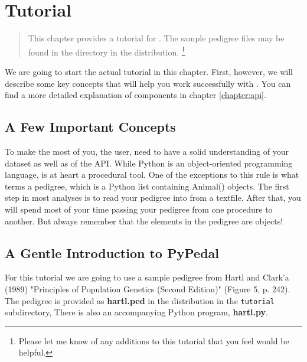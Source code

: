 \chapter{Tutorial}
\label{cha:tutorial}

\begin{quote} 
   This chapter provides a tutorial for \PYPEDAL{}.  The sample pedigree files may be found in the directory \texttt{} in the distribution. \footnote{Please let me know of any additions to this tutorial that you feel would be helpful.}
\end{quote}

We are going to start the actual tutorial in this chapter.  First, however, we will describe some key concepts that will help you work successfully with \PYPEDAL{}.  You can find a more detailed explanation of \PYPEDAL{} components in chapter \ref{chapter:api}.

\section{A Few Important Concepts}
To make the most of \PYPEDAL{} you, the user, need to have a solid understanding of your dataset as well as of the \PYPEDAL{} API.  While Python is an object-oriented programming language, \PYPEDAL{} is at heart a procedural tool.  One of the exceptions to this rule is what \PYPEDAL{} terms a pedigree, which is a Python list containing Animal() objects.  The first step in most \PYPEDAL{} analyses is to read your pedigree into \PYPEDAL{} from a textfile.  After that, you will spend most of your time passing your pedigree from one procedure to another.  But always remember that the elements in the pedigree are objects!


\section{A Gentle Introduction to PyPedal}
For this tutorial we are going to use a sample pedigree from Hartl and Clark'a (1989) "Principles of Population Genetics (Second Edition)" (Figure 5, p. 242).  The pedigree is provided as \textbf{hartl.ped} in the distribution in the \texttt{tutorial} subdirectory,  There is also an accompanying Python program, \textbf{hartl.py}.

